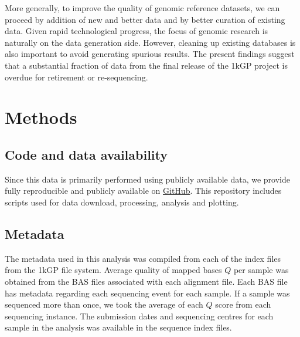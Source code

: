 \documentclass[9pt,article]{template}
\begin{document}
More generally, to improve the quality of genomic reference datasets, we can proceed by addition of new and better data and by better curation of existing data.
Given rapid technological progress, the focus of genomic research is naturally on the data generation side. 
However, cleaning up existing databases is also important to avoid generating spurious results. 
The present findings suggest that a substantial fraction of data from the final release of the 1kGP project is overdue for retirement or re-sequencing.

\section{Methods}
\subsection{Code and data availability}
Since this data is primarily performed using publicly available data, we provide fully reproducible and publicly available on \href{https://github.com/LukeAndersonTrocme/LegacyData}{GitHub}.
This repository includes scripts used for data download, processing, analysis and plotting.

\subsection{Metadata}
The metadata used in this analysis was compiled from each of the index files from the 1kGP file system. 
Average quality of mapped bases $Q$ per sample was obtained from the BAS files associated with each alignment file.
Each BAS file has metadata regarding each sequencing event for each sample. 
If a sample was sequenced more than once, we took the average of each $Q$ score from each sequencing instance. 
The submission dates and sequencing centres for each sample in the analysis was available in the sequence index files.
\end{document}
